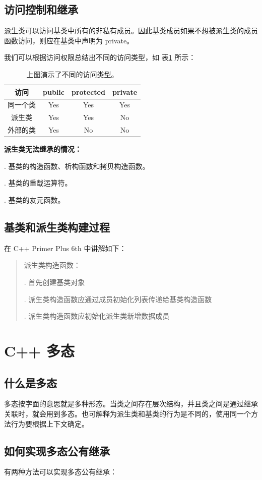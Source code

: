 \documentclass[UTF8,18pt]{ctexart}
\newenvironment{myquote}
{\begin{quote}\kaishu\zihao{-5}}
	{\end{quote}}
\begin{document}
\subsection{访问控制和继承}
派生类可以访问基类中所有的非私有成员。因此基类成员如果不想被派生类的成员函数访问，则应在基类中声明为 private。

我们可以根据访问权限总结出不同的访问类型，如 表\ref{tb:xianzhi} 所示：
\begin{table}[H]
	\centering
	\begin{tabular}{|c|*{3}{c}|}
		\hline
		访问&public&protected&private \\
		\hline
		同一个类&Yes&Yes&Yes \\
		派生类&Yes&Yes&No \\
		外部的类&Yes&No&No \\
		\hline
	\end{tabular}
	\caption{上图演示了不同的访问类型。}
	\label{tb:xianzhi}
\end{table}

\textbf{派生类无法继承的情况：}

. 基类的构造函数、析构函数和拷贝构造函数。

. 基类的重载运算符。

. 基类的友元函数。

\subsection{基类和派生类构建过程}
在 C++ Primer Plus 6th 中讲解如下：
\begin{myquote}
派生类构造函数：

. 首先创建基类对象

. 派生类构造函数应通过成员初始化列表传递给基类构造函数

. 派生类构造函数应初始化派生类新增数据成员
\end{myquote}
\section{C++ 多态}

\subsection{什么是多态}
多态按字面的意思就是多种形态。当类之间存在层次结构，并且类之间是通过继承关联时，就会用到多态。也可解释为派生类和基类的行为是不同的，使用同一个方法行为要根据上下文确定。

\subsection{如何实现多态公有继承}
有两种方法可以实现多态公有继承：
\end{document}
